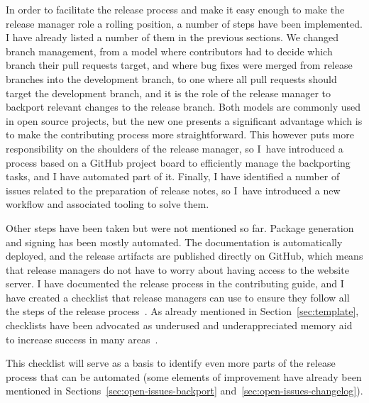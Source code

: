 \label{sec:open-issues-release}

In order to facilitate the release process and make it easy enough to make the release manager role a rolling position, a number of steps have been implemented.
I have already listed a number of them in the previous sections.
We changed branch management, from a model where contributors had to decide which branch their pull requests target, and where bug fixes were merged from release branches into the development branch, to one where all pull requests should target the development branch, and it is the role of the release manager to backport relevant changes to the release branch.
Both models are commonly used in open source projects, but the new one presents a significant advantage which is to make the contributing process more straightforward.
This however puts more responsibility on the shoulders of the release manager, so I have introduced a process based on a GitHub project board to efficiently manage the backporting tasks, and I have automated part of it.
Finally, I have identified a number of issues related to the preparation of release notes, so I have introduced a new workflow and associated tooling to solve them.

Other steps have been taken but were not mentioned so far.
Package generation and signing has been mostly automated.
The documentation is automatically deployed, and the release artifacts are published directly on GitHub, which means that release managers do not have to worry about having access to the website server.
I have documented the release process in the contributing guide, and I have created a checklist that release managers can use to ensure they follow all the steps of the release process~\cite{coq_release_checklist}.
As already mentioned in Section~\ref{sec:template}, checklists have been advocated as underused and underappreciated memory aid to increase success in many areas~\cite{gawande2010checklist,oxman1994systematic,parker2018empowering}.

This checklist will serve as a basis to identify even more parts of the release process that can be automated (some elements of improvement have already been mentioned in Sections~\ref{sec:open-issues-backport} and~\ref{sec:open-issues-changelog}).

